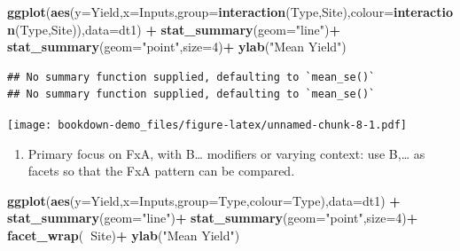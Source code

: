 \documentclass[
]{book}
\newenvironment{Shaded}{\begin{snugshade}}{\end{snugshade}}
\newcommand{\DataTypeTok}[1]{\textcolor[rgb]{0.13,0.29,0.53}{#1}}
\newcommand{\DecValTok}[1]{\textcolor[rgb]{0.00,0.00,0.81}{#1}}
\newcommand{\KeywordTok}[1]{\textcolor[rgb]{0.13,0.29,0.53}{\textbf{#1}}}
\newcommand{\NormalTok}[1]{#1}
\newcommand{\OperatorTok}[1]{\textcolor[rgb]{0.81,0.36,0.00}{\textbf{#1}}}
\newcommand{\StringTok}[1]{\textcolor[rgb]{0.31,0.60,0.02}{#1}}
\providecommand{\tightlist}{%
  \setlength{\itemsep}{0pt}\setlength{\parskip}{0pt}}
\begin{document}
\begin{Shaded}
\begin{Highlighting}[]
\KeywordTok{ggplot}\NormalTok{(}\KeywordTok{aes}\NormalTok{(}\DataTypeTok{y=}\NormalTok{Yield,}\DataTypeTok{x=}\NormalTok{Inputs,}\DataTypeTok{group=}\KeywordTok{interaction}\NormalTok{(Type,Site),}\DataTypeTok{colour=}\KeywordTok{interaction}\NormalTok{(Type,Site)),}\DataTypeTok{data=}\NormalTok{dt1) }\OperatorTok{+}
\StringTok{  }\KeywordTok{stat_summary}\NormalTok{(}\DataTypeTok{geom=}\StringTok{"line"}\NormalTok{)}\OperatorTok{+}
\StringTok{    }\KeywordTok{stat_summary}\NormalTok{(}\DataTypeTok{geom=}\StringTok{"point"}\NormalTok{,}\DataTypeTok{size=}\DecValTok{4}\NormalTok{)}\OperatorTok{+}
\StringTok{      }\KeywordTok{ylab}\NormalTok{(}\StringTok{"Mean Yield"}\NormalTok{)}
\end{Highlighting}
\end{Shaded}

\begin{verbatim}
## No summary function supplied, defaulting to `mean_se()`
## No summary function supplied, defaulting to `mean_se()`
\end{verbatim}

\texttt{[image: bookdown-demo\_files/figure-latex/unnamed-chunk-8-1.pdf]}

\begin{enumerate}
\def\labelenumi{\arabic{enumi}.}
\setcounter{enumi}{5}
\tightlist
\item
  Primary focus on FxA, with B\ldots{} modifiers or varying context: use B,\ldots{} as facets so that the FxA pattern can be compared.
\end{enumerate}

\begin{Shaded}
\begin{Highlighting}[]
\KeywordTok{ggplot}\NormalTok{(}\KeywordTok{aes}\NormalTok{(}\DataTypeTok{y=}\NormalTok{Yield,}\DataTypeTok{x=}\NormalTok{Inputs,}\DataTypeTok{group=}\NormalTok{Type,}\DataTypeTok{colour=}\NormalTok{Type),}\DataTypeTok{data=}\NormalTok{dt1) }\OperatorTok{+}
\StringTok{  }\KeywordTok{stat_summary}\NormalTok{(}\DataTypeTok{geom=}\StringTok{"line"}\NormalTok{)}\OperatorTok{+}
\StringTok{    }\KeywordTok{stat_summary}\NormalTok{(}\DataTypeTok{geom=}\StringTok{"point"}\NormalTok{,}\DataTypeTok{size=}\DecValTok{4}\NormalTok{)}\OperatorTok{+}
\StringTok{  }\KeywordTok{facet_wrap}\NormalTok{(}\OperatorTok{~}\NormalTok{Site)}\OperatorTok{+}
\StringTok{      }\KeywordTok{ylab}\NormalTok{(}\StringTok{"Mean Yield"}\NormalTok{)}
\end{Highlighting}
\end{Shaded}
\end{document}
